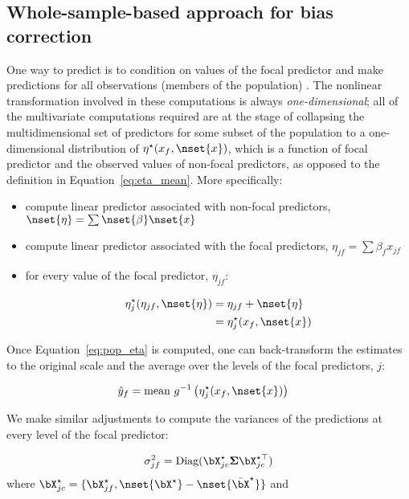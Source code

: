 \subsection{Whole-sample-based approach for bias correction}

One way to predict is to condition on values of the focal predictor and make predictions for all observations (members of the population) \citep{hanmer2013behind}. The nonlinear transformation involved in these computations is always \emph{one-dimensional}; all of the multivariate computations required are at the stage of collapsing the multidimensional set of predictors for some subset of the population to a one-dimensional distribution of $\eta^\star(x_f, \nset{x})$, which is a function of focal predictor and the observed values of non-focal predictors, as opposed to the definition in Equation~\ref{eq:eta_mean}. More specifically:

\begin{itemize}
\item compute linear predictor associated with non-focal predictors, $\nset{\eta} = \sum \nset{\beta} \nset{x}$
\item compute linear predictor associated with the focal predictors, $\eta_{jf} = \sum{\beta_f x_{jf}}$
\item for every value of the focal predictor, $\eta_{jf}$:

\begin{align}\label{eq:pop_eta} 
\eta_j^\star(\eta_{jf}, \nset{\eta})  &= \eta_{jf} + \nset{\eta} \nonumber \\
&= \eta_j^\star(x_f, \nset{x})
\end{align}
\end{itemize}

Once Equation~\ref{eq:pop_eta} is computed, one can back-transform the estimates to the original scale and the average over the levels of the focal predictors, $j$:

\begin{align}\label{eq:pop_response} 
\hat{y}_f  &= \textrm{mean} ~ g^{-1} \left(\eta_j^\star(x_f, \nset{x})\right)
\end{align}

We make similar adjustments to compute the variances of the predictions at every level of the focal predictor:

\begin{align}
\sigma_{jf}^2 = \textrm{Diag}(\bX^\star_{jc} \boldsymbol{\Sigma} \bX^{\star\top}_{jc})
\end{align}
where $\bX^{\star}_{jc} = \{\bX_{jf}^\star, \nset{{\bX}^\star} - \nset{{\bar{\bX}}^\star}\}$ and 

